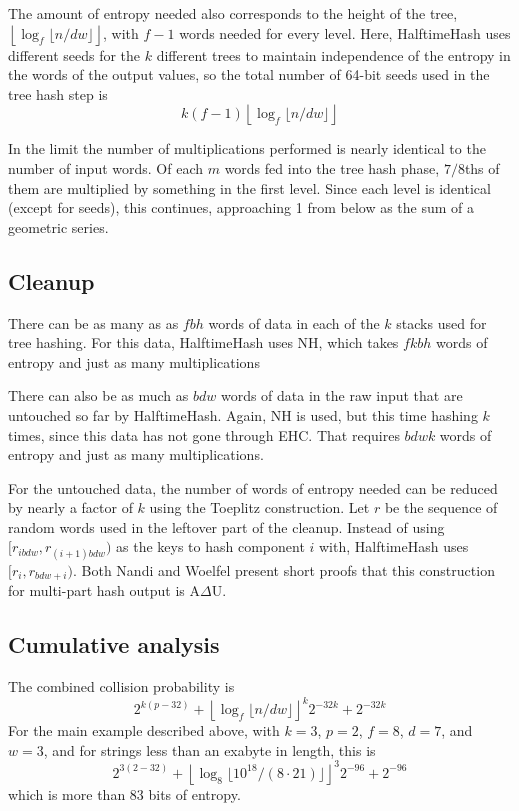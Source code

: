 \documentclass[sigconf, nonacm]{acmart}
\begin{document}
The amount of entropy needed also corresponds to the height of the tree, $\left\lfloor\log_f \lfloor n/dw\rfloor\right\rfloor$, with $f - 1$ words needed for every level.
Here, HalftimeHash uses different seeds for the $k$ different trees to maintain independence of the entropy in the words of the output values, so the total number of 64-bit seeds used in the tree hash step is \[k(f-1)\left\lfloor\log_f \lfloor n/dw\rfloor\right\rfloor\]

In the limit the number of multiplications performed is nearly identical to the number of input words.
Of each $m$ words fed into the tree hash phase, $7/8$ths of them are multiplied by something in the first level.
Since each level is identical (except for seeds), this continues, approaching 1 from below as the sum of a geometric series.

\subsection{Cleanup}

There can be as many as as $f b h$ words of data in each of the $k$ stacks used for tree hashing.
For this data, HalftimeHash uses NH, which takes $f k b h$ words of entropy and just as many multiplications

There can also be as much as $b d w$ words of data in the raw input that are untouched so far by HalftimeHash.
Again, NH is used, but this time hashing $k$ times, since this data has not gone through EHC.
That requires $b d w k$ words of entropy and just as many multiplications.

For the untouched data, the number of words of entropy needed can be reduced by nearly a factor of $k$ using the Toeplitz construction. 
Let $r$ be the sequence of random words used in the leftover part of the cleanup.
Instead of using $[r_{ibdw}, r_{(i+1)bdw})$ as the keys to hash component $i$ with, HalftimeHash uses $[r_{i}, r_{bdw + i})$.
Both Nandi and Woelfel present short proofs that this construction for multi-part hash output is A$\Delta$U. \cite{ehc-nandi,woelfel-toeplitz}


\subsection{Cumulative analysis}

The combined collision probability is
\[2^{k(p-32)} + \left\lfloor \log_f \lfloor n / d w \rfloor \right\rfloor^k 2^{-32k} + 2^{-32k}\]
For the main example described above, with $k=3$, $p=2$, $f=8$, $d = 7$, and $w=3$, and for strings less than an exabyte in length, this is
\[2^{3(2-32)} + \left\lfloor \log_8 \lfloor 10^{18} /(8 \cdot 21) \rfloor \right\rfloor^3 2^{-96} + 2^{-96}\]
which is more than 83 bits of entropy.
\end{document}
